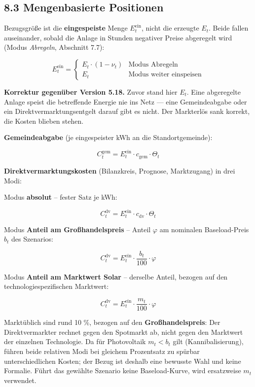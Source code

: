 \documentclass[
  a4paper,
  10pt]{article}
\renewenvironment{quote}
  {\begin{tcolorbox}[
      enhanced,
      breakable,
      colback=Wash,
      colframe=Brand,
      boxrule=0pt,
      leftrule=2.2pt,
      arc=0pt,
      left=8pt,right=8pt,top=6pt,bottom=6pt,
      before skip=8pt,after skip=9pt
    ]\small\color{InkSoft}}
  {\end{tcolorbox}}
\begin{document}
\hypertarget{mengenbasierte-positionen}{%
\subsection{8.3 Mengenbasierte
Positionen}\label{mengenbasierte-positionen}}

Bezugsgröße ist die \textbf{eingespeiste} Menge \(E^{\mathrm{ein}}_t\),
nicht die erzeugte \(E_t\). Beide fallen auseinander, sobald die Anlage
in Stunden negativer Preise abgeregelt wird (Modus \emph{Abregeln},
Abschnitt 7.7):

\[ E^{\mathrm{ein}}_t = \begin{cases}
E_t \cdot (1 - \nu_t) & \text{Modus Abregeln} \\
E_t & \text{Modus weiter einspeisen}
\end{cases} \]

\begin{quote}
\textbf{Korrektur gegenüber Version 5.18.} Zuvor stand hier \(E_t\).
Eine abgeregelte Anlage speist die betreffende Energie nie ins Netz ---
eine Gemeindeabgabe oder ein Direktvermarktungsentgelt darauf gibt es
nicht. Der Markterlös sank korrekt, die Kosten blieben stehen.
\end{quote}

\textbf{Gemeindeabgabe} (je eingespeister kWh an die Standortgemeinde):

\[ C^{\mathrm{gem}}_t = E^{\mathrm{ein}}_t \cdot c_{\mathrm{gem}} \cdot \Theta_t \]

\textbf{Direktvermarktungskosten} (Bilanzkreis, Prognose, Marktzugang)
in drei Modi:

Modus \textbf{absolut} -- fester Satz je kWh:

\[ C^{\mathrm{dv}}_t = E^{\mathrm{ein}}_t \cdot c_{\mathrm{dv}} \cdot \Theta_t \]

Modus \textbf{Anteil am Großhandelspreis} -- Anteil \(\varphi\) am
nominalen Baseload-Preis \(b_t\) des Szenarios:

\[ C^{\mathrm{dv}}_t = E^{\mathrm{ein}}_t \cdot \frac{b_t}{100} \cdot \varphi \]

Modus \textbf{Anteil am Marktwert Solar} -- derselbe Anteil, bezogen auf
den technologiespezifischen Marktwert:

\[ C^{\mathrm{dv}}_t = E^{\mathrm{ein}}_t \cdot \frac{m_t}{100} \cdot \varphi \]

Marktüblich sind rund 10 \%, bezogen auf den \textbf{Großhandelspreis}:
Der Direktvermarkter rechnet gegen den Spotmarkt ab, nicht gegen den
Marktwert der einzelnen Technologie. Da für Photovoltaik \(m_t < b_t\)
gilt (Kannibalisierung), führen beide relativen Modi bei gleichem
Prozentsatz zu spürbar unterschiedlichen Kosten; der Bezug ist deshalb
eine bewusste Wahl und keine Formalie. Führt das gewählte Szenario keine
Baseload-Kurve, wird ersatzweise \(m_t\) verwendet.
\end{document}
